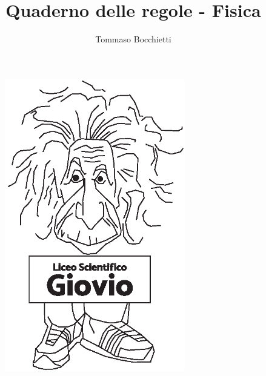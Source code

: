 \documentclass{../.common/high-school-notebook}
\begin{document}
\title{Quaderno delle regole - Fisica}
\author{Tommaso Bocchietti}

\maketitle

\begin{figure}[H]
  \centering
  \includegraphics[width=0.7\textwidth]{../.common/Einstein_Logo}
  \label{fig:Einstein_Logo}
\end{figure}


\clearpage
\tableofcontents

% 

% 
% 
% 

% 
% 
% 
% 
% 
% 
% 
% 

\clearpage
% 
% 
% 
% 

% 

\clearpage








% 
\end{document}

